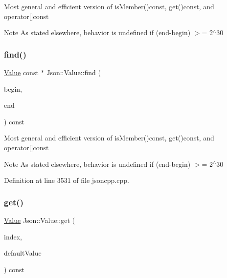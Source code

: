 Most general and efficient version of is\+Member()const, get()const, and operator\mbox{[}\mbox{]}const \begin{DoxyNote}{Note}
As stated elsewhere, behavior is undefined if (end-\/begin) $>$= 2$^\wedge$30 
\end{DoxyNote}
\hypertarget{class_json_1_1_value_afb007b9ce9b2cf9d5f667a07e5e0349f}{}\label{class_json_1_1_value_afb007b9ce9b2cf9d5f667a07e5e0349f} 
\subsubsection{\texorpdfstring{find()}{find()}\hspace{0.1cm}{\footnotesize\ttfamily [2/2]}}
{\footnotesize\ttfamily \hyperlink{class_json_1_1_value}{Value} const  $\ast$ Json\+::\+Value\+::find (\begin{DoxyParamCaption}\item[{char const $\ast$}]{begin,  }\item[{char const $\ast$}]{end }\end{DoxyParamCaption}) const}

Most general and efficient version of is\+Member()const, get()const, and operator\mbox{[}\mbox{]}const \begin{DoxyNote}{Note}
As stated elsewhere, behavior is undefined if (end-\/begin) $>$= 2$^\wedge$30 
\end{DoxyNote}


Definition at line 3531 of file jsoncpp.\+cpp.

\hypertarget{class_json_1_1_value_a034eb7bf85a44fa759bdaa232788ca66}{}\label{class_json_1_1_value_a034eb7bf85a44fa759bdaa232788ca66} 
\subsubsection{\texorpdfstring{get()}{get()}\hspace{0.1cm}{\footnotesize\ttfamily [1/8]}}
{\footnotesize\ttfamily \hyperlink{class_json_1_1_value}{Value} Json\+::\+Value\+::get (\begin{DoxyParamCaption}\item[{\hyperlink{class_json_1_1_value_a184a91566cccca7b819240f0d5561c7d}{Array\+Index}}]{index,  }\item[{const \hyperlink{class_json_1_1_value}{Value} \&}]{default\+Value }\end{DoxyParamCaption}) const}

